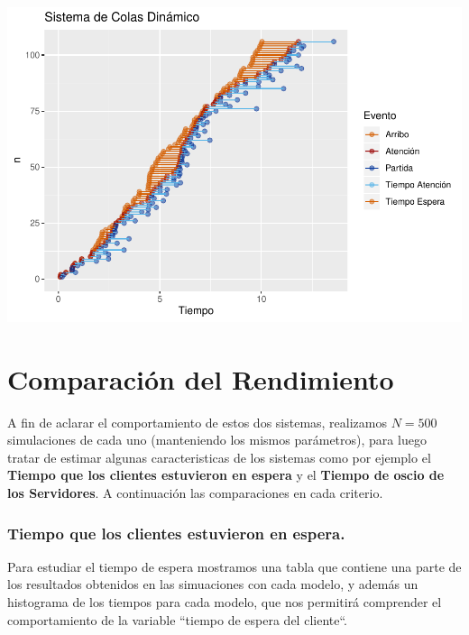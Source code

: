 \documentclass[]{article}
\begin{document}
\begin{flushright}\includegraphics{sistema_dinamico_files/figure-latex/unnamed-chunk-9-1} \end{flushright}

\newpage

\section{Comparación del Rendimiento}\label{comparacion-del-rendimiento}

A fin de aclarar el comportamiento de estos dos sistemas, realizamos
\(N=500\) simulaciones de cada uno (manteniendo los mismos parámetros),
para luego tratar de estimar algunas caracteristicas de los sistemas
como por ejemplo el \textbf{Tiempo que los clientes estuvieron en
espera} y el \textbf{Tiempo de oscio de los Servidores}. A continuación
las comparaciones en cada criterio.

\subsubsection{Tiempo que los clientes estuvieron en
espera.}\label{tiempo-que-los-clientes-estuvieron-en-espera.}

Para estudiar el tiempo de espera mostramos una tabla que contiene una
parte de los resultados obtenidos en las simuaciones con cada modelo, y
además un histograma de los tiempos para cada modelo, que nos permitirá
comprender el comportamiento de la variable ``tiempo de espera del
cliente``.
\end{document}
